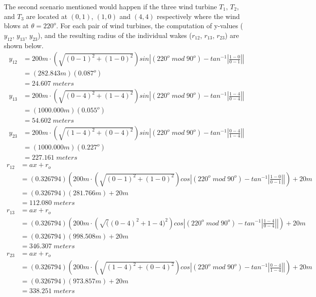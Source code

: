     The second scenario mentioned would happen if the three wind turbine $T_1$, $T_2$, and $T_3$ are located at $(0,1)$, $(1,0)$ and $(4,4)$ respectively where the wind blows at $\theta=220^o$. For each pair of wind turbines, the computation of  y-values ($y_{12}$, $y_{13}$, $y_{23}$), and the resulting radius of the individual wakes ($r_{12}$, $r_{13}$, $r_{23}$) are shown below.
    \begin{align*}
        y_{12}
        &=200m\cdot \left( \sqrt{(0-1)^2+(1-0)^2} \right) sin \left| (220^o\;mod\;90^o) - tan^{-1}\left|\frac{1-0}{0-1}\right| \right| \\
        &=\left( 282.843m \right)(0.087^o) \\
        &= 24.607\;meters
    \end{align*}
    \begin{align*}
        y_{13}
        &=200m\cdot \left( \sqrt{(0-4)^2+(1-4)^2} \right) sin \left| (220^o\;mod\;90^o) - tan^{-1}\left|\frac{1-4}{0-4}\right| \right| \\
        &=\left( 1000.000m \right)(0.055^o) \\
        &= 54.602\;meters
    \end{align*}
    \begin{align*}
        y_{23}
        &=200m\cdot \left( \sqrt{(1-4)^2+(0-4)^2} \right) sin \left| (220^o\;mod\;90^o) - tan^{-1}\left|\frac{0-4}{1-4}\right| \right| \\
        &=\left( 1000.000m \right)(0.227^o) \\
        &= 227.161\;meters
    \end{align*}
    \begin{align*}
        r_{12}
        &= ax+r_o \\
        &= (0.326794)\left( 200m\cdot \left( \sqrt{(0-1)^2+(1-0)^2} \right)cos \left| (220^o\;mod\;90^o) - tan^{-1}\left|\frac{1-0}{0-1}\right| \right|  \right) + 20m \\
        &=(0.326794)(281.766m)+20m \\
        &= 112.080\;meters
    \end{align*}
    \begin{align*}
        r_{13}
        &= ax+r_o \\
        &= (0.326794)\left( 200m\cdot \left( \sqrt((0-4)^2+{1-4)^2} \right)cos \left| (220^o\;mod\;90^o) - tan^{-1}\left|\frac{1-4}{0-4}\right| \right| \right) + 20m \\
        &=(0.326794)(998.508m)+20m \\
        &= 346.307\;meters
    \end{align*}
    \begin{align*}
        r_{23}
        &= ax+r_o \\
        &= (0.326794)\left( 200m\cdot \left( \sqrt{(1-4)^2+(0-4)^2} \right)cos \left| (220^o\;mod\;90^o) - tan^{-1}\left|\frac{0-4}{1-4}\right| \right| \right) + 20m \\
        &=(0.326794)(973.857m)+20m \\
        &= 338.251\;meters
    \end{align*}
    
